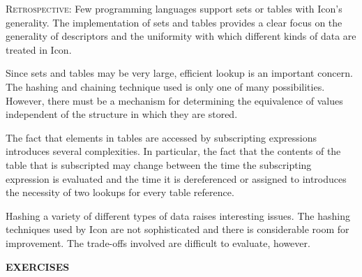 \textsc{Retrospective}: Few programming languages support sets or
tables with Icon's generality. The implementation of sets and tables
provides a clear focus on the generality of descriptors and the
uniformity with which different kinds of data are treated in Icon.

Since sets and tables may be very large, efficient lookup is an
important concern. The hashing and chaining technique used is only one
of many possibilities. However, there must be a mechanism for
determining the equivalence of values independent of the structure in
which they are stored.

The fact that elements in tables are accessed by subscripting
expressions introduces several complexities. In particular, the fact
that the contents of the table that is subscripted may change between
the time the subscripting expression is evaluated and the time it is
dereferenced or assigned to introduces the necessity of two lookups
for every table reference.

Hashing a variety of different types of data raises interesting
issues. The hashing techniques used by Icon are not sophisticated and
there is considerable room for improvement. The trade-offs involved
are difficult to evaluate, however.

{\sffamily\bfseries EXERCISES}

